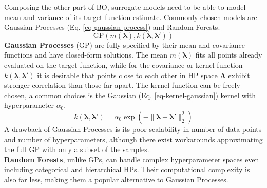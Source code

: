 \documentclass[twoside,11pt]{article}
\begin{document}
Composing the other part of BO, surrogate models need to be able to model mean and variance of its target function estimate.
Commonly chosen models are Gaussian Processes (Eq. \ref{eq-gaussian-process}) and Random Forests.
\begin{equation}  %
  \text{GP}(m(\boldsymbol\lambda), k(\boldsymbol\lambda,\boldsymbol\lambda'))
  \label{eq-gaussian-process}
\end{equation}
\textbf{Gaussian Processes} (GP) are fully specified by their mean and covariance functions and have closed-form solutions.
The mean $m(\boldsymbol\lambda)$ fits all points already evaluated on the target function, while for the covariance or
kernel function $k(\boldsymbol\lambda,\boldsymbol\lambda')$ it is desirable that points close to
each other in HP space $\boldsymbol\Lambda$ exhibit stronger correlation than those far apart.
The kernel function can be freely chosen, a common choices is the Gaussian (Eq. \ref{eq-kernel-gaussian}) kernel with
hyperparameter $\alpha_0$. \citep[p. 5]{frazier2018tutorialbayesianoptimization}
\begin{equation}
  k(\boldsymbol\lambda,\boldsymbol\lambda')=\alpha_0 \exp(-\|\boldsymbol\lambda-\boldsymbol\lambda'\|_2^2)
  \label{eq-kernel-gaussian}
\end{equation}
A drawback of Gaussian Processes is its poor scalability in number of data points and number of hyperparameters, although there exist workarounds approximating the full GP
with only a subset of the samples. \citep[chap. 1.3.2]{feurer_hyperparameter_2019}
\\
\textbf{Random Forests}, unlike GPs, can handle complex hyperparameter spaces even including categorical and hierarchical HPs. Their computational complexity is also far
less, making them a popular alternative to Gaussian Processes. \citep[chap. 1.3.2]{feurer_hyperparameter_2019}

  
\end{document}
